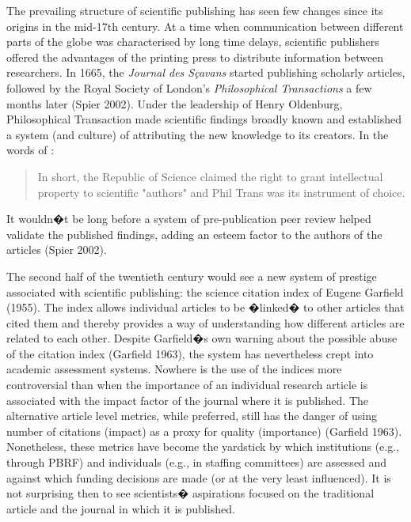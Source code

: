\documentclass[final,authoryear,3p]{elsarticle-open-drafting}
\begin{document}
The prevailing structure of scientific publishing has seen few changes since its origins in the mid-17th century. At a time when 
communication between different parts of the globe was characterised by long time delays, scientific publishers offered the
advantages of the printing press to distribute information between researchers. In 1665, the {\it Journal des S{\c{c}}avans} started 
publishing scholarly articles, followed by the
Royal Society of London's {\it Philosophical Transactions} a few months later (Spier 2002).
Under the leadership of Henry Oldenburg, Philosophical Transaction made scientific findings broadly known and established a 
system (and culture) of attributing the new knowledge to its creators. In the words of  \href{http://www.webcitation.org/5zE16KjXJ}{\citep{guedon2001ols}}: 
\begin{quote}
In short, the Republic of Science claimed the right to grant intellectual property to scientific "authors" and Phil Trans was its instrument of choice.  
\end{quote}

It wouldn�t be long before a system of pre-publication peer review helped validate the published findings, adding an esteem factor 
to the authors of the articles (Spier 2002). 

The second half of the twentieth century would see a new system of prestige associated with scientific publishing: the science 
citation index of Eugene Garfield (1955). The index allows individual articles to be �linked� to other articles that cited them and 
thereby provides a way of understanding how different articles are related to each other.  Despite Garfield�s own warning about 
the possible abuse of the citation index (Garfield 1963), the system has nevertheless crept into academic assessment systems. 
Nowhere is the use of the indices more controversial than when the importance of an individual research article is associated 
with the impact factor of the journal where it is published. The alternative article level metrics, while preferred, still has the danger 
of using number of citations (impact) as a proxy for quality (importance) (Garfield 1963). Nonetheless, these metrics have 
become the yardstick by which institutions (e.g., through PBRF) 
and individuals (e.g., in staffing committees) are assessed and 
against which funding decisions are made (or at the very least influenced). It is not surprising then to see scientists� aspirations 
focused on the traditional article and the journal in which it is published.
\end{document}
